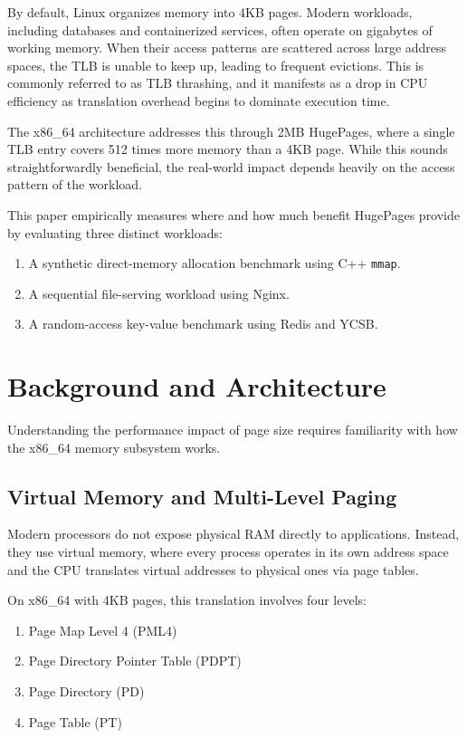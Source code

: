 \documentclass[conference]{IEEEtran}
\begin{document}
By default, Linux organizes memory into 4KB pages. Modern workloads, including databases and containerized services, often operate on gigabytes of working memory. When their access patterns are scattered across large address spaces, the TLB is unable to keep up, leading to frequent evictions. This is commonly referred to as TLB thrashing, and it manifests as a drop in CPU efficiency as translation overhead begins to dominate execution time.

The x86\_64 architecture addresses this through 2MB HugePages, where a single TLB entry covers 512 times more memory than a 4KB page. While this sounds straightforwardly beneficial, the real-world impact depends heavily on the access pattern of the workload.

This paper empirically measures where and how much benefit HugePages provide by evaluating three distinct workloads:
\begin{enumerate}
    \item A synthetic direct-memory allocation benchmark using C++ \texttt{mmap}.
    \item A sequential file-serving workload using Nginx.
    \item A random-access key-value benchmark using Redis and YCSB.
\end{enumerate}

\section{Background and Architecture}
Understanding the performance impact of page size requires familiarity with how the x86\_64 memory subsystem works.

\subsection{Virtual Memory and Multi-Level Paging}
Modern processors do not expose physical RAM directly to applications. Instead, they use virtual memory, where every process operates in its own address space and the CPU translates virtual addresses to physical ones via page tables.

On x86\_64 with 4KB pages, this translation involves four levels:
\begin{enumerate}
    \item Page Map Level 4 (PML4)
    \item Page Directory Pointer Table (PDPT)
    \item Page Directory (PD)
    \item Page Table (PT)
\end{enumerate}
\end{document}
